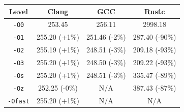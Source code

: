 \begin{tabular*}{\columnwidth}{@{\extracolsep\fill}cccc@{\extracolsep\fill}}
\toprule
\textbf{Level} & \textbf{Clang} & \textbf{GCC} & \textbf{Rustc} \\
\midrule
\texttt{-O0} & 253.45 & 256.11 & 2998.18 \\
\texttt{-O1} & 255.20 (+1\%) & 251.46 (-2\%) & 287.40 (-90\%) \\
\texttt{-O2} & 255.19 (+1\%) & 248.51 (-3\%) & 209.18 (-93\%) \\
\texttt{-O3} & 255.20 (+1\%) & 248.50 (-3\%) & 209.22 (-93\%) \\
\texttt{-Os} & 255.20 (+1\%) & 248.51 (-3\%) & 335.47 (-89\%) \\
\texttt{-Oz} & 252.25 (-0\%) & N/A & 387.43 (-87\%) \\
\texttt{-Ofast} & 255.20 (+1\%) & N/A & N/A \\
\bottomrule
\end{tabular*}
